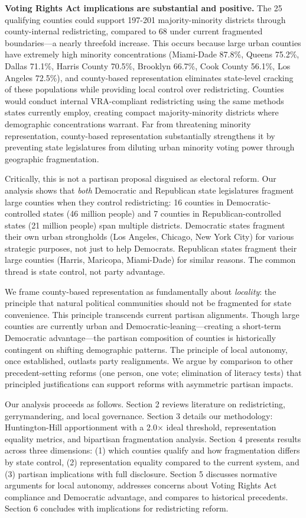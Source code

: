 \textbf{Voting Rights Act implications are substantial and positive.} The 25 qualifying counties could support 197-201 majority-minority districts through county-internal redistricting, compared to 68 under current fragmented boundaries---a nearly threefold increase. This occurs because large urban counties have extremely high minority concentrations (Miami-Dade 87.8\%, Queens 75.2\%, Dallas 71.1\%, Harris County 70.5\%, Brooklyn 66.7\%, Cook County 56.1\%, Los Angeles 72.5\%), and county-based representation eliminates state-level cracking of these populations while providing local control over redistricting. Counties would conduct internal VRA-compliant redistricting using the same methods states currently employ, creating compact majority-minority districts where demographic concentrations warrant. Far from threatening minority representation, county-based representation substantially strengthens it by preventing state legislatures from diluting urban minority voting power through geographic fragmentation.

Critically, this is not a partisan proposal disguised as electoral reform. Our analysis shows that \emph{both} Democratic and Republican state legislatures fragment large counties when they control redistricting: 16 counties in Democratic-controlled states (46 million people) and 7 counties in Republican-controlled states (21 million people) span multiple districts. Democratic states fragment their own urban strongholds (Los Angeles, Chicago, New York City) for various strategic purposes, not just to help Democrats. Republican states fragment their large counties (Harris, Maricopa, Miami-Dade) for similar reasons. The common thread is state control, not party advantage.

We frame county-based representation as fundamentally about \emph{locality}: the principle that natural political communities should not be fragmented for state convenience. This principle transcends current partisan alignments. Though large counties are currently urban and Democratic-leaning---creating a short-term Democratic advantage---the partisan composition of counties is historically contingent on shifting demographic patterns. The principle of local autonomy, once established, outlasts party realignments. We argue by comparison to other precedent-setting reforms (one person, one vote; elimination of literacy tests) that principled justifications can support reforms with asymmetric partisan impacts.

Our analysis proceeds as follows. Section 2 reviews literature on redistricting, gerrymandering, and local governance. Section 3 details our methodology: Huntington-Hill apportionment with a 2.0$\times$ ideal threshold, representation equality metrics, and bipartisan fragmentation analysis. Section 4 presents results across three dimensions: (1) which counties qualify and how fragmentation differs by state control, (2) representation equality compared to the current system, and (3) partisan implications with full disclosure. Section 5 discusses normative arguments for local autonomy, addresses concerns about Voting Rights Act compliance and Democratic advantage, and compares to historical precedents. Section 6 concludes with implications for redistricting reform.
